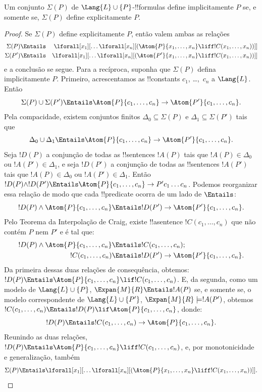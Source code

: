 \documentclass[../../../include/open-logic-section]{subfiles}
\begin{document}
\begin{thm} Um conjunto $\Sigma(P)$
  de $\Lang{L} \cup\{P\}$-!!{formula}s define implicitamente $P$ se, e
  somente se, $\Sigma(P)$ define explicitamente $P$.
\end{thm}

\begin{proof}
Se $\Sigma(P)$ define explicitamente $P$, então valem ambas as relações
\begin{align*}
  \Sigma(P) & \Entails & \lforall[x_1][\dots \lforall[x_n]
    [(\Atom{P}{x_1,\dots, x_n} \liff !C(x_1,\dots,x_n))]]\\
  \Sigma(P') & \Entails & \lforall[x_1][\dots \lforall[x_n]
    [(\Atom{P'}{x_1,\dots, x_n} \liff !C(x_1,\dots,x_n))]]
\end{align*}
e a conclusão se segue. Para a recíproca, suponha que $\Sigma(P)$
defina implicitamente $P$. Primeiro, acrescentamos as !!{constant}s
$c_1$, \dots,~$c_n$ a $\Lang{L}$. Então
\[
\Sigma(P) \cup \Sigma(P') \Entails
\Atom{P}{c_1, \dots, c_n} \to  \Atom{P'}{c_1, \dots, c_n}.
\]
Pela compacidade, existem conjuntos finitos
$\Delta_0 \subseteq \Sigma(P)$ e $\Delta_1 \subseteq \Sigma(P')$ tais
que
\[
\Delta_0 \cup \Delta_1 \Entails
\Atom{P}{c_1, \dots, c_n} \to \Atom{P'}{c_1, \dots, c_n}.
\]
Seja $!D(P)$ a conjunção de todas as !!{sentence}s $!A(P)$ tais que
$!A(P) \in \Delta_0$ ou $!A(P') \in \Delta_1$, e seja $!D(P')$ a
conjunção de todas as !!{sentence}s $!A(P')$ tais que
$!A(P) \in \Delta_0$ ou $!A(P') \in \Delta_1$. Então
$!D(P) \land !D(P') \Entails
\Atom{P}{c_1, \dots, c_n} \to P'c_1\dots c_n$. Podemos reorganizar
essa relação de modo que cada !!{predicate} ocorra de um lado de
$\Entails$:
\[
!D(P) \land \Atom{P}{c_1, \dots, c_n} \Entails
!D(P') \to \Atom{P'}{c_1, \dots, c_n}.
\]
Pelo Teorema da Interpolação de Craig, existe !!a{sentence}
$!C(c_1,\dots, c_n)$ que não contém $P$ nem $P'$ e é tal que:
\begin{align*}
  !D(P) \land \Atom{P}{c_1, \dots, c_n} & \Entails !C(c_1,\dots, c_n); \\
  !C(c_1,\dots, c_n) & \Entails !D(P') \to \Atom{P'}{c_1, \dots, c_n}.
\end{align*}
Da primeira dessas duas relações de consequência, obtemos:
$!D(P) \Entails
\Atom{P}{c_1,\dots, c_n} \lif !C(c_1,\dots, c_n)$. E, da segunda,
como um modelo de $\Lang{L} \cup \{P\}$, $\Expan{M}{R}
\Entails !A(P)$ se, e somente se, o modelo correspondente de
$\Lang{L} \cup \{P'\}$, $\Expan{M}{R} \models !A(P')$, obtemos
$!C(c_1,\dots, c_n) \Entails
!D(P) \lif \Atom{P}{c_1,\dots, c_n}$, donde:
\[
!D(P) \Entails !C(c_1,\dots,c_n) \to \Atom{P}{c_1,\dots, c_n}.
\]
Reunindo as duas relações,
$!D(P) \Entails \Atom{P}{c_1,\dots, c_n}
\liff !C(c_1, \dots, c_n)$, e, por monotonicidade e generalização,
também
\[
\Sigma(P) \Entails
\lforall[x_1][\dots\lforall[x_n][(\Atom{P}{x_1,\dots, x_n} \liff
    !C(x_1,\dots, x_n))]].
\]
\end{proof}
\end{document}
